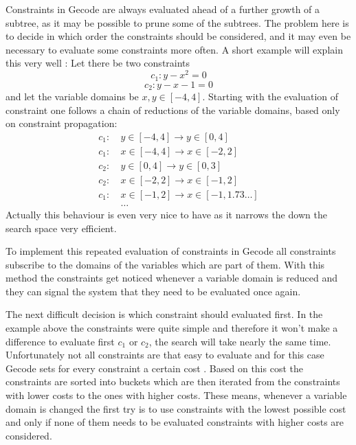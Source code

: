 \documentclass[10pt,
               a4paper,
               journal,
               ]{IEEEtran}
\begin{document}
	Constraints in Gecode are always evaluated ahead of a further growth of a subtree, as it may be possible to prune some of the subtrees. The problem here is to decide in which order the constraints should be considered, and it may even be necessary to evaluate some constraints more often. A short example will explain this very well \cite[p.~575]{handbookCP}: Let there be two constraints 
	\begin{equation}
		c_1: y - x^2 = 0
	\end{equation}
	\begin{equation}
		c_2: y - x - 1 = 0
	\end{equation}
	and let the variable domains be $x, y \in [-4, 4]$. Starting with the evaluation of constraint one follows a chain of reductions of the variable domains, based only on constraint propagation:
	\begin{equation}
	\begin{split}
		c_1:\ &y \in [-4, 4] \rightarrow y \in [0, 4] \\
		c_1:\ &x \in [-4, 4] \rightarrow x \in [-2, 2] \\
		c_2:\ &y \in [0, 4] \rightarrow y \in [0, 3] \\
		c_2:\ &x \in [-2, 2] \rightarrow x \in [-1, 2] \\
		c_1:\ &x \in [-1, 2] \rightarrow x \in [-1, 1.73 \dots] \\
		&\dots
	\end{split}
	\end{equation}
	Actually this behaviour is even very nice to have as it narrows the down the search space very efficient.
	
	To implement this repeated evaluation of constraints in Gecode all constraints subscribe to the domains of the variables which are part of them. With this method the constraints get noticed whenever a variable domain is reduced and they can signal the system that they need to be evaluated once again.
	
	The next difficult decision is which constraint should evaluated first. In the example above the constraints were quite simple and therefore it won't make a difference to evaluate first $c_1$ or $c_2$, the search will take nearly the same time. Unfortunately not all constraints are that easy to evaluate and for this case Gecode sets for every constraint a certain cost \cite[p.~275]{programmingGecode}. Based on this cost the constraints are sorted into buckets which are then iterated from the constraints with lower costs to the ones with higher costs. These means, whenever a variable domain is changed the first try is to use constraints with the lowest possible cost and only if none of them needs to be evaluated constraints with higher costs are considered.
	
\end{document}
